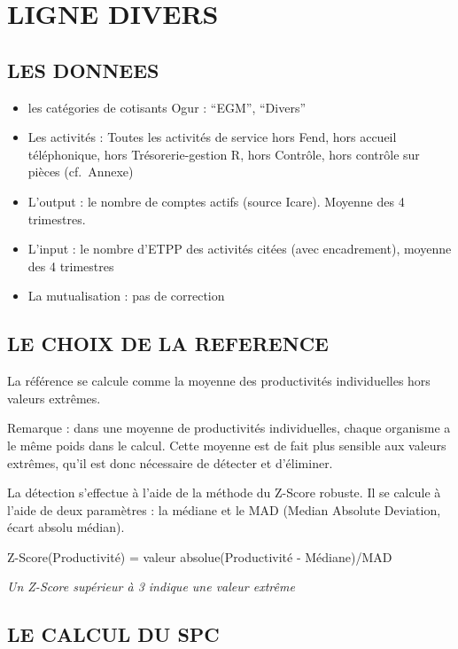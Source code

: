\documentclass[
]{book}
\begin{document}
\hypertarget{ligne-divers}{%
\chapter{LIGNE DIVERS}\label{ligne-divers}}

\hypertarget{les-donnees-11}{%
\section{LES DONNEES}\label{les-donnees-11}}

\begin{itemize}
\item
  les catégories de cotisants Ogur : ``EGM'', ``Divers''
\item
  Les activités :
  Toutes les activités de service hors Fend, hors accueil téléphonique, hors Trésorerie-gestion R, hors Contrôle, hors contrôle sur pièces (cf.~Annexe)
\item
  L'output : le nombre de comptes actifs (source Icare). Moyenne des 4 trimestres.
\item
  L'input : le nombre d'ETPP des activités citées (avec encadrement), moyenne des 4 trimestres
\item
  La mutualisation : pas de correction
\end{itemize}

\hypertarget{le-choix-de-la-reference-6}{%
\section{LE CHOIX DE LA REFERENCE}\label{le-choix-de-la-reference-6}}

La référence se calcule comme la moyenne des productivités individuelles hors valeurs extrêmes.

Remarque : dans une moyenne de productivités individuelles, chaque organisme a le même poids dans le calcul. Cette moyenne est de fait plus sensible aux valeurs extrêmes, qu'il est donc nécessaire de détecter et d'éliminer.

La détection s'effectue à l'aide de la méthode du Z-Score robuste.
Il se calcule à l'aide de deux paramètres : la médiane et le MAD (Median Absolute Deviation, écart absolu médian).

Z-Score(Productivité) = valeur absolue(Productivité - Médiane)/MAD

\emph{Un Z-Score supérieur à 3 indique une valeur extrême}

\hypertarget{le-calcul-du-spc-8}{%
\section{LE CALCUL DU SPC}\label{le-calcul-du-spc-8}}
\end{document}
